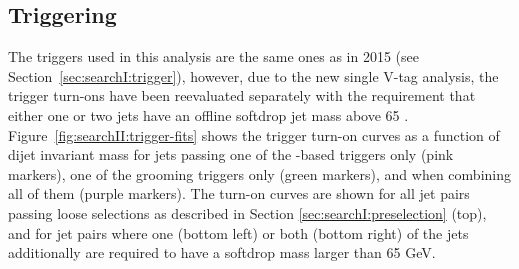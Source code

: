 \subsection{Triggering}
The triggers used in this analysis are the same ones as in 2015 (see Section~\ref{sec:searchI:trigger}), however, due to the new single V-tag analysis, the trigger turn-ons have been reevaluated separately with the requirement that either one or two jets have an offline softdrop jet mass above 65 \GeV. Figure~\ref{fig:searchII:trigger-fits} shows the trigger turn-on curves as a function of dijet invariant mass for jets passing one of the \HT-based triggers only (pink markers), one of the grooming triggers only (green markers), and when combining all of them (purple markers). The turn-on curves are shown for all jet pairs passing loose selections as described in Section \ref{sec:searchI:preselection} (top), and for jet pairs where one (bottom left) or both (bottom right) of the jets additionally are required to have a softdrop mass larger than 65 GeV.
